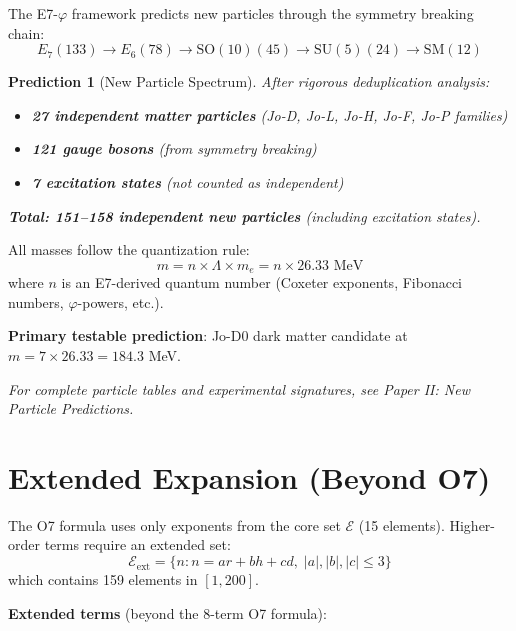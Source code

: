 \documentclass[11pt,a4paper]{article}
\newtheorem{prediction}{Prediction}
\begin{document}
The E7-$\varphi$ framework predicts new particles through the symmetry breaking chain:
\begin{equation}
E_7(133) \to E_6(78) \to \text{SO}(10)(45) \to \text{SU}(5)(24) \to \text{SM}(12)
\end{equation}

\begin{prediction}[New Particle Spectrum]
After rigorous deduplication analysis:
\begin{itemize}
\item \textbf{27 independent matter particles} (Jo-D, Jo-L, Jo-H, Jo-F, Jo-P families)
\item \textbf{121 gauge bosons} (from symmetry breaking)
\item \textbf{7 excitation states} (not counted as independent)
\end{itemize}
\textbf{Total: 151--158 independent new particles} (including excitation states).
\end{prediction}

All masses follow the quantization rule:
\begin{equation}
m = n \times \Lambda \times m_e = n \times 26.33 \text{ MeV}
\end{equation}
where $n$ is an E7-derived quantum number (Coxeter exponents, Fibonacci numbers, $\varphi$-powers, etc.).

\textbf{Primary testable prediction}: Jo-D0 dark matter candidate at $m = 7 \times 26.33 = \mathbf{184.3}$ MeV.

\textit{For complete particle tables and experimental signatures, see Paper II: New Particle Predictions.}

\section{Extended Expansion (Beyond O7)}

The O7 formula uses only exponents from the core set $\mathcal{E}$ (15 elements). Higher-order terms require an extended set:
\begin{equation}
\mathcal{E}_{\text{ext}} = \{n : n = ar + bh + cd, \; |a|,|b|,|c| \leq 3\}
\end{equation}
which contains 159 elements in $[1,200]$.

\textbf{Extended terms} (beyond the 8-term O7 formula):
\end{document}

